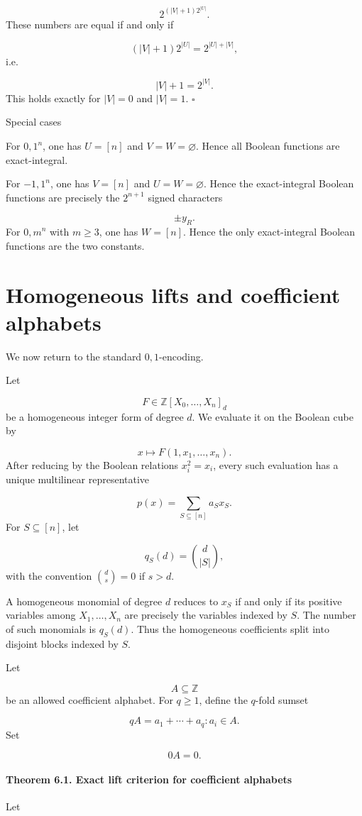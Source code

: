 \documentclass[11pt]{article}
\theoremstyle{definition}
\begin{document}
\[
2^{(|V|+1)2^{|U|}}.
\]
These numbers are equal if and only if

\[
(|V|+1)2^{|U|}
=
2^{|U|+|V|},
\]
i.e.

\[
|V|+1=2^{|V|}.
\]
This holds exactly for $|V|=0$ and $|V|=1$. $\square$

Special cases

For ${0,1}^n$, one has $U=[n]$ and $V=W=\varnothing$. Hence all Boolean functions are exact-integral.

For ${-1,1}^n$, one has $V=[n]$ and $U=W=\varnothing$. Hence the exact-integral Boolean functions are precisely the $2^{n+1}$ signed characters

\[
\pm y_R.
\]
For ${0,m}^n$ with $m\ge3$, one has $W=[n]$. Hence the only exact-integral Boolean functions are the two constants.

\section{Homogeneous lifts and coefficient alphabets}
We now return to the standard ${0,1}$-encoding.

Let

\[
F\in\mathbb{Z}[X_0,\dots,X_n]_d
\]
be a homogeneous integer form of degree $d$. We evaluate it on the Boolean cube by

\[
x\mapsto F(1,x_1,\dots,x_n).
\]
After reducing by the Boolean relations $x_i^2=x_i$, every such evaluation has a unique multilinear representative

\[
p(x)=\sum_{S\subseteq[n]}a_Sx_S.
\]
For $S\subseteq[n]$, let

\[
q_S(d)=\binom d{|S|},
\]
with the convention $\binom ds=0$ if $s>d$.

A homogeneous monomial of degree $d$ reduces to $x_S$ if and only if its positive variables among $X_1,\dots,X_n$ are precisely the variables indexed by $S$. The number of such monomials is $q_S(d)$. Thus the homogeneous coefficients split into disjoint blocks indexed by $S$.

Let

\[
A\subseteq\mathbb{Z}
\]
be an allowed coefficient alphabet. For $q\ge1$, define the $q$-fold sumset

\[
qA={a_1+\cdots+a_q:a_i\in A}.
\]
Set

\[
0A={0}.
\]
\paragraph{Theorem 6.1. Exact lift criterion for coefficient alphabets}
Let
\end{document}
